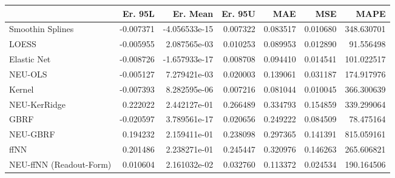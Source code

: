 \begin{tabular}{lrrrrrr}
\toprule
{} &   Er. 95L &      Er. Mean &   Er. 95U &       MAE &       MSE &        MAPE \\
\midrule
Smoothin Splines        & -0.007371 & -4.056533e-15 &  0.007322 &  0.083517 &  0.010680 &  348.630701 \\
LOESS                   & -0.005955 &  2.087565e-03 &  0.010253 &  0.089953 &  0.012890 &   91.556498 \\
Elastic Net             & -0.008726 & -1.657933e-17 &  0.008708 &  0.094410 &  0.014541 &  101.022517 \\
NEU-OLS                 & -0.005127 &  7.279421e-03 &  0.020003 &  0.139061 &  0.031187 &  174.917976 \\
Kernel                  & -0.007393 &  8.282595e-06 &  0.007216 &  0.081044 &  0.010045 &  366.300639 \\
NEU-KerRidge            &  0.222022 &  2.442127e-01 &  0.266489 &  0.334793 &  0.154859 &  339.299064 \\
GBRF                    & -0.020597 &  3.789561e-17 &  0.020656 &  0.249222 &  0.084509 &   78.475164 \\
NEU-GBRF                &  0.194232 &  2.159411e-01 &  0.238098 &  0.297365 &  0.141391 &  815.059161 \\
ffNN                    &  0.201486 &  2.238271e-01 &  0.245447 &  0.320976 &  0.146263 &  265.606821 \\
NEU-ffNN (Readout-Form) &  0.010604 &  2.161032e-02 &  0.032760 &  0.113372 &  0.024534 &  190.164506 \\
\bottomrule
\end{tabular}

